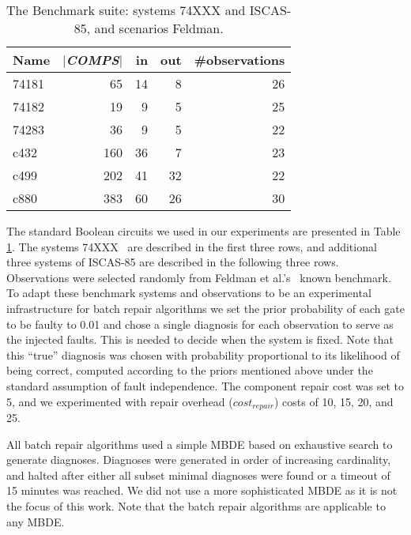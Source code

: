 \documentclass[letterpaper]{article}
\newcommand{\COMPS}{\textit{COMPS}}
\begin{document}
\begin{table}\centering
{\small
\begin{tabular}{|l|r|r|r|r|}
\hline
 {\bf Name} & {\bf $|${\tiny \COMPS}$|$} & {\bf in} & {\bf out} & {\bf \#observations} \\
\hline
    74181  & 65    & 14   & 8    & 26 \\
    74182  & 19    & 9    & 5    & 25 \\
    74283  & 36    & 9    & 5    & 22 \\
\hline
    c432   & 160   & 36   & 7    & 23\\
    c499   & 202   & 41   & 32   & 22\\
    c880   & 383   & 60   & 26   &  30\\
\hline
\end{tabular}
\caption{The Benchmark suite: systems  {\small 74XXX} and
         {\small ISCAS-85}, and scenarios Feldman.}
\label{tab:systems}
}
\end{table}%

The standard Boolean circuits we used in our experiments are presented in Table \ref{tab:systems}. The systems {\small 74XXX}~\cite{Hansen99} are described in the first three rows, and additional three systems of {\small ISCAS-85} \cite{Brglez89} are described in the following three rows. Observations were selected randomly from Feldman et al.'s~ known benchmark.
To adapt these benchmark systems and observations to be an experimental infrastructure for batch repair algorithms we set the prior probability of each gate to be faulty to 0.01 and chose a single diagnosis for each observation to serve as the injected faults. This is needed to decide when the system is fixed. Note that this ``true'' diagnosis was chosen with probability proportional to its likelihood of being correct, computed according to the priors mentioned above under the standard assumption of fault independence. The component repair cost was set to 5, and we experimented with repair overhead ($cost_{repair}$) costs of 10, 15, 20, and 25.

All batch repair algorithms used a simple MBDE based on exhaustive search to generate diagnoses. Diagnoses were generated in order of increasing cardinality, and halted after either all subset minimal diagnoses were found or a timeout of 15 minutes was reached. We did not use a more sophisticated MBDE as it is not the focus of this work. Note that the batch repair algorithms are applicable to any MBDE.
\end{document}
